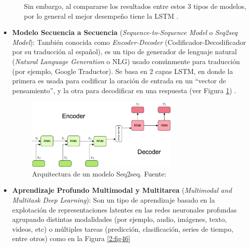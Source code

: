 \begin{itemize}
\begin{itemize}
		Sin embargo, al compararse los resultados entre estos 3 tipos de modelos, por lo general el mejor desempeño tiene la LSTM \parencite{bk_brownlee2017deeplearning_nlp}.
	\end{itemize}
	
	\item \textbf{Modelo Secuencia a Secuencia} (\textit{Sequence-to-Sequence Model} o \textit{Seq2seq Model}): También conocida como \textit{Encoder-Decoder} (Codificador-Decodificador por su traducción al español), es un tipo de generador de lenguaje natural (\textit{Natural Language Generation} o NLG) usado comúnmente para traducción (por ejemplo, Google Traductor). Se basa en 2 capas LSTM, en donde la primera es usada para codificar la oración de entrada en un “vector de pensamiento”, y la otra para decodificar en una respuesta (ver Figura \ref{2:fig45}) \parencite{bk_deng2018deeplearningnlp}.
	
	\begin{figure}[!ht]
		\begin{center}
			\includegraphics[width=0.7\textwidth]{2/figures/encoder-decoder.jpeg}
			\caption[Arquitectura de un modelo Seq2seq]{Arquitectura de un modelo Seq2seq. Fuente: \cite{tec_kostadinov2019seq2seq}}
			\label{2:fig45}
		\end{center}
	\end{figure}
	
	\item \textbf{Aprendizaje Profundo Multimodal y Multitarea} (\textit{Multimodal and Multitask Deep Learning}): Son un tipo de aprendizaje basado en la explotación de representaciones latentes en las redes neuronales profundas agrupando distintas modalidades (por ejemplo, audio, imágenes, texto, videos, etc) o múltiples tareas (predicción, clasificación, series de tiempo, entre otros) como en la Figura \ref{2:fig46} \parencite{bk_deng2018deeplearningnlp}
	

\end{itemize}
